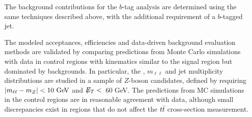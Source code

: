 The background contributions for the $b$-tag analysis are determined
using the same techniques described above, with the additional
requirement of a $b$-tagged jet.

The modeled acceptances, efficiencies and data-driven background
evaluation methods are validated by comparing predictions from Monte
Carlo simulations with data in control regions with kinematics
similar to the signal region but dominated by backgrounds. In
particular, the \met, $m_{\ell\ell}$ and jet multiplicity
distributions are studied in a sample of $Z$-boson candidates,
defined by requiring $|m_{\ell\ell} - m_Z| < 10 \GeV$ and $\not\!\!{E_{T}}
<$~60 GeV. The predictions from MC simulations in the control
regions are in reasonable agreement with data, although small
discrepancies exist in regions that do not affect the $t\bar{t}$
cross-section measurement.


\newcommand{\DYZeeNJetsTwoJet}{$4.0^{+2.5}_{-1.2}$}
\newcommand{\DYZmmNJetsTwoJet}{$14.4^{+5.4}_{-4.2}$}
\newcommand{\ZtteeNJetsTwoJet}{4.9 $\pm$ 2.6}
\newcommand{\ZttmmNJetsTwoJet}{11.0 $\pm$ 5.0}
\newcommand{\ZttemNJetsTwoJet}{43 $\pm$ 16}
\newcommand{\FakeWeeNJetsTwoJet}{4.0 $\pm$ 5.0}
\newcommand{\FakeWmmNJetsTwoJet}{6.3 $\pm$ 4.1}
\newcommand{\FakeWemNJetsTwoJet}{44 $\pm$ 24}
\newcommand{\singletopeeNJetsTwoJet}{6.4$^{+1.2}_{-1.1}$}
\newcommand{\singletopmmNJetsTwoJet}{16.0$^{+1.9}_{-2.2}$}
\newcommand{\singletopemNJetsTwoJet}{41.1 $\pm$ 5.5}
\newcommand{\dibosoneeNJetsTwoJet}{5.9 $\pm$ 1.1}
\newcommand{\dibosonmmNJetsTwoJet}{8.7$^{+1.2}_{-1.5}$}
\newcommand{\dibosonemNJetsTwoJet}{32.9 $\pm$ 4.9}

\newcommand{\TotalNonttbaree}{25.2 $\pm$ 6.4}
\newcommand{\TotalNonttbarmm}{56.5 $\pm$ 9.4}
\newcommand{\TotalNonttbarem}{161 $\pm$ 34}

\newcommand{\ttbareeNJetsTwoJet}{124 $\pm$ 17}
\newcommand{\ttbarmmNJetsTwoJet}{$241^{+15}_{-18}$}
\newcommand{\ttbaremNJetsTwoJet}{746 $\pm$ 42}

\newcommand{\TotalExpectedee}{149 $\pm$ 18}
\newcommand{\TotalExpectedmm}{$298^{+17}_{-20}$}
\newcommand{\TotalExpectedem}{907 $\pm$ 54}

\newcommand{\DataeeNJetsTwoJet}{165}
\newcommand{\DatammNJetsTwoJet}{301}
\newcommand{\DataemNJetsTwoJet}{963}

\newcommand{\DYZeTLNJetsTwoJet}{$24.3^{+10.7}_{-9.4}$}
\newcommand{\DYZmTLNJetsTwoJet}{$22.0^{+5.3}_{-5.8}$}
\newcommand{\ZtteTLNJetsTwoJet}{$17.0^{+8.4}_{-7.6}$}
\newcommand{\ZttmTLNJetsTwoJet}{25 $\pm$ 11}
\newcommand{\FakeWeTLNJetsTwoJet}{74 $\pm$ 15}
\newcommand{\FakeWmTLNJetsTwoJet}{85 $\pm$ 17}
\newcommand{\singletopeTLNJetsTwoJet}{$5.7^{+1.0}_{-0.9}$}
\newcommand{\singletopmTLNJetsTwoJet}{$6.3^{+0.8}_{-1.1}$}
\newcommand{\dibosoneTLNJetsTwoJet}{$5.9^{+0.9}_{-0.8}$}
\newcommand{\dibosonmTLNJetsTwoJet}{$4.8^{+0.6}_{-0.7}$}

